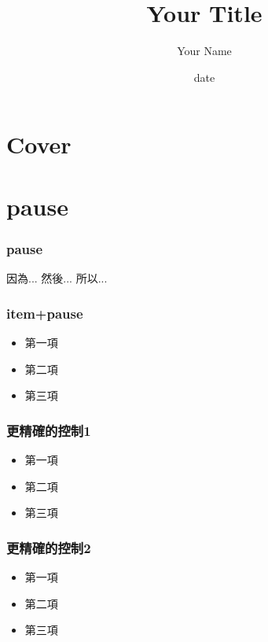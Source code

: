 \documentclass[xcolor=svgnames]{beamer}
\begin{document}
\title[Your Title\hspace{14em}\insertframenumber/\inserttotalframenumber]{Your Title} 
\author{Your Name}
\date{date}

\section{Cover}
\begin{frame}
\titlepage
\end{frame}

\section{pause}
\begin{frame}
\frametitle{pause} %
因為...
\pause
然後...
\pause
所以...
\end{frame}

\begin{frame}
\frametitle{item+pause} %
\begin{itemize}
\item 第一項
\pause
\item 第二項
\pause
\item 第三項
\end{itemize}
\end{frame}

\begin{frame}
\frametitle{更精確的控制1} %
\begin{itemize}
\item<1-> 第一項
\item<2-> 第二項
\item<3-> 第三項
\end{itemize}
\end{frame}

\begin{frame}
\frametitle{更精確的控制2} %
\begin{itemize}
\item<1-> 第一項
\item<2-> 第二項
\item<3-> 第三項
\end{itemize}
\end{frame}
\end{document}
